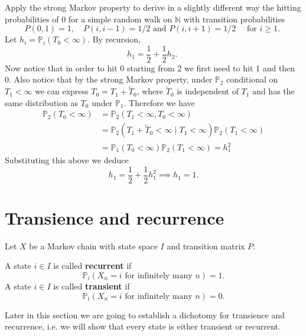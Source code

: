\documentclass[a4paper]{article}
\begin{document}
\begin{example}
    Apply the strong Markov property to derive in a slightly different way the hitting probabilities of 0 for a simple random walk on $\mathbb{N}$ with transition probabilities
    \[
    P(0,1)=1,\quad P(i, i-1)=1 / 2 \text { and } P(i, i+1)=1 / 2\quad \text { for } i \geq 1 \text {. }
    \]
    Let $h_i=\mathbb{P}_i\left(T_0<\infty\right)$. By recursion, 
    \[
    h_1=\frac{1}{2}+\frac{1}{2} h_2 \text {. }
    \]
    Now notice that in order to hit 0 starting from 2 we first need to hit 1 and then 0. Also notice that by the strong Markov property, under $\mathbb{P}_2$ conditional on $T_1<\infty$ we can express $T_0=T_1+\tilde{T}_0$, where $\tilde{T}_0$ is independent of $T_1$ and has the same distribution as $T_0$ under $\mathbb{P}_1$. Therefore we have
    \begin{align*}
        \mathbb{P}_2\left(T_0<\infty\right)&=\mathbb{P}_2\left(T_1<\infty, T_0<\infty\right)\\ 
        &=\mathbb{P}_2\left(T_1+\tilde{T}_0<\infty \mid T_1<\infty\right) \mathbb{P}_2\left(T_1<\infty\right) \\
        &=\mathbb{P}_1\left(T_0<\infty\right) \mathbb{P}_2\left(T_1<\infty\right)=h_1^2
    \end{align*}
    Substituting this above we deduce
    \[
    h_1=\frac{1}{2}+\frac{1}{2} h_1^2 \implies h_1=1 .
    \]
\end{example}

\section{Transience and recurrence}
Let $X$ be a Markov chain with state space $I$ and transition matrix $P$.
\begin{definition}
    A state $i \in I$ is called \textbf{recurrent} if
    \[
    \mathbb{P}_i\left(X_n=i \text { for infinitely many } n\right)=1 .
    \]
    A state $i \in I$ is called \textbf{transient} if
    \[
    \mathbb{P}_i\left(X_n=i \text { for infinitely many } n\right)=0 .
    \]
\end{definition}
Later in this section we are going to establish a dichotomy for transience and recurrence, i.e. we will show that every state is either transient or recurrent.
\end{document}
